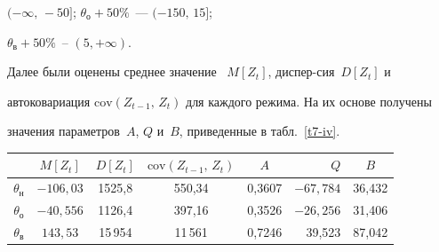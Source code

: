 $(-\infty,\, -50]$; $\theta_{\mathrm{о}}+ 50\%$~--- $(-150,\, 15]$; 


$\theta_{\mathrm{в}}+ 50\%$~-- $(5, +\infty)$.





      


Далее были оценены среднее значение ~$M[Z_t]$, диспер-\linebreak сия~$D[Z_t]$ и 


автоковариация $\mathrm{cov}\left(Z_{t-1},\,Z_t\right)$ для каждого режима. На их основе получены 


значения параметров~$A$, $Q$ и~$B$, приведенные в табл.~\ref{t7-iv}.


      


\begin{table}\small


\begin{center}




\vspace*{2ex}





\tabcolsep=5pt


\begin{tabular}{|c|c|c|c|c|r|c|}


\hline


&$M[Z_t]$ &$D[Z_t]$ &$\mathrm{cov} (Z_{t-1},\,Z_t)$ &$A$&$Q$&$B$\\


\hline


$\theta_{\mathrm{н}}$&$-106{,}03$&1525,8&550,34&0,3607&$-67{,}784$&36,432\\


$\theta_{\mathrm{о}}$&\hphantom{99}$-40{,}556$&1126,4&397,16&0,3526&$-26{,}256$&31,406\\


$\theta_{\mathrm{в}}$&\hphantom{$-$}$143{,}53$&15\,954\hphantom{,\,99}&11\,561\hphantom{999\,,}&0,7246&39,523&87,042\\


\hline


\end{tabular}


\end{center}


\end{table}


